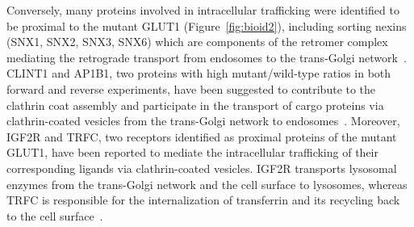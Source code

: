 Conversely, many proteins involved in intracellular trafficking were identified to be proximal to the mutant GLUT1 (Figure~\ref{fig:bioid2}), including sorting nexins (SNX1, SNX2, SNX3, SNX6) which are components of the retromer complex mediating the retrograde transport from endosomes to the trans-Golgi network~\cite{Rojas,Carlton,Mari,Harterink}. CLINT1 and AP1B1, two proteins with high mutant/wild-type ratios in both forward and reverse experiments, have been suggested to contribute to the clathrin coat assembly and participate in the transport of cargo proteins via clathrin-coated vesicles from the trans-Golgi network to endosomes~\cite{McMahon,Mills,Kalthoff,Hirst}. Moreover, IGF2R and TRFC, two receptors identified as proximal proteins of the mutant GLUT1, have been reported to mediate the intracellular trafficking of their corresponding ligands via clathrin-coated vesicles. IGF2R transports lysosomal enzymes from the trans-Golgi network and the cell surface to lysosomes, whereas TRFC is responsible for the internalization of transferrin and its recycling back to the cell surface~\cite{Byrd,Daro}. 

